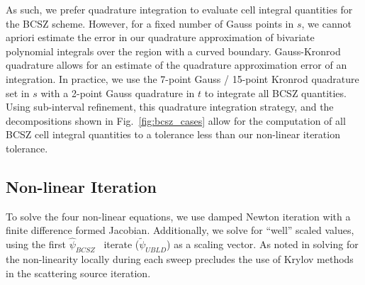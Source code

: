 \documentclass{mc2015}
\newcommand{\fig}[1]{Fig.~\ref{#1}}                      %
\newcommand{\BCSZH}{\ensuremath{\widehat{\psi}_{BCSZ}}}
\begin{document}
As such, we prefer quadrature integration to evaluate cell integral quantities for the BCSZ scheme.
However, for a fixed number of Gauss points in $s$, we cannot apriori estimate the error in our quadrature approximation of bivariate polynomial integrals over the region with a curved boundary.
Gauss-Kronrod quadrature \cite{gk_quad} allows for an estimate of the quadrature approximation error of an integration.
In practice, we use the 7-point Gauss / 15-point Kronrod quadrature set in $s$ with a 2-point Gauss quadrature in $t$ to integrate all BCSZ quantities.
Using  sub-interval refinement, this quadrature integration strategy, and the decompositions shown in \fig{fig:bcsz_cases} allow for the computation of all BCSZ cell integral quantities to a tolerance less than our non-linear iteration tolerance.

\subsection{Non-linear Iteration}
To solve the four non-linear equations, we use damped Newton iteration with a finite difference formed Jacobian.
Additionally, we solve for ``well'' scaled values, using the first \BCSZH~ iterate ($\widetilde{\psi}_{UBLD}$) as a scaling vector.
As noted in \cite{csz_me,csz_don} solving for the non-linearity locally during each sweep precludes the use of Krylov methods in the scattering source iteration.
\end{document}
